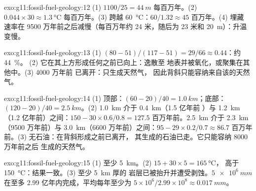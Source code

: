 \begin{solution}{exo:g11:fossil-fuel-geology:12}
(1) $1100/25 = \qty{44}{m}$ 每百万年。(2) $0.044 \times 30
\approx \qty{1.3}{\degreeCelsius}$ 每百万年。(3) 跨越
\qty{60}{\degreeCelsius}：$60/1.32 \approx 45$ 百万年。(4) 埋藏
速率在 9500 万年前之后减慢（每百万年约 24 米，随后为 23 米和
\qty{20}{m}）：升温变慢。
\end{solution}

\begin{solution}{exo:g11:fossil-fuel-geology:13}
(1) $(80 - 51)/(117 - 51) = 29/66 \approx 0.44$：约 \qty{44}{\percent}。
(2) 它在其上方形成任何之前已向上：逸散至
地表并被氧化，或聚集在其他中。(3) 4000 万年前
已离开：只生成天然气，
因此背斜只能容纳来自该的天然气。
\end{solution}

\begin{solution}{exo:g11:fossil-fuel-geology:14}
(1) 顶部：$(60 - 20)/40 = \qty{1.0}{km}$；底部：$(120 - 20)/40 =
\qty{2.5}{km}$。(2) \qty{1.0}{km} 介于 \qty{0.4}{km}（1.5 亿年前
）与 \qty{1.2}{km}（1.2 亿年前）之间：$150 - 30 \times 0.6/0.8 = 127.5$
百万年前。\qty{2.5}{km} 介于 \qty{2.3}{km}（9500 万年前）与
\qty{3.0}{km}（6600 万年前）之间：$95 - 29 \times 0.2/0.7 \approx 86.7$
百万年前。(3) 无石油：在背斜形成之前已离开，
其生成的石油已走。它只能容纳 8000 万年前之后
生成的天然气。
\end{solution}

\begin{solution}{exo:g11:fossil-fuel-geology:15}
(1) 至少 \qty{5}{km}。(2) $15 + 30 \times 5 = \qty{165}{\degreeCelsius}$，
高于 \qty{150}{\degreeCelsius}：结果一致。(3) 至少 \qty{5}{km} 厚的
岩层已被抬升并遭受剥蚀。$\qty{5e6}{mm}$ 在至多
2.99 亿年内完成，平均每年至少为 $5 \times 10^6/2.99 \times 10^8
\approx \qty{0.017}{mm}$。
\end{solution}

